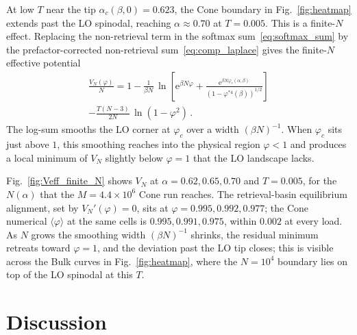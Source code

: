 \documentclass[letterpaper]{article} %
\newcommand{\e}{{\mathrm{e}}}
\newcommand{\Bnet}{\beta}
\newcommand{\ac}{\alpha_c}
\begin{document}
At low $T$ near the tip $\ac(\Bnet, 0) = 0.623$, the Cone boundary in Fig.~\ref{fig:heatmap} extends past the LO spinodal, reaching $\alpha \approx 0.70$ at $T = 0.005$. This is a finite-$N$ effect. Replacing the non-retrieval term in the softmax sum~\eqref{eq:softmax_sum} by the prefactor-corrected non-retrieval sum~\eqref{eq:comp_laplace} gives the finite-$N$ effective potential
\begin{multline}
\frac{V_N(\varphi)}{N} = 1 - \frac{1}{\Bnet N}\,
   \ln\!\left[\e^{\Bnet N \varphi} +
            \frac{\e^{\Bnet N \varphi_c(\alpha, \Bnet)}}{(1-\varphi^{*4}(\Bnet))^{1/2}} \right] \\
    - \frac{T(N-3)}{2N}\,\ln(1 - \varphi^{2})\,.
\label{eq:V-finite-N}
\end{multline}
The log-sum smooths the LO corner at $\varphi_c$ over a width $(\Bnet N)^{-1}$. When $\varphi_c$ sits just above $1$, this smoothing reaches into the physical region $\varphi < 1$ and produces a local minimum of $V_N$ slightly below $\varphi = 1$ that the LO landscape lacks.

Fig.~\ref{fig:Veff_finite_N} shows $V_N$ at $\alpha = 0.62, 0.65, 0.70$ and $T = 0.005$, for the $N(\alpha)$ that the $M = 4.4 \times 10^6$ Cone run reaches. The retrieval-basin equilibrium alignment, set by $V_N'(\varphi) = 0$, sits at $\varphi = 0.995, 0.992, 0.977$; the Cone numerical $\langle\varphi\rangle$ at the same cells is $0.995, 0.991, 0.975$, within $0.002$ at every load. As $N$ grows the smoothing width $(\Bnet N)^{-1}$ shrinks, the residual minimum retreats toward $\varphi = 1$, and the deviation past the LO tip closes; this is visible across the Bulk curves in Fig.~\ref{fig:heatmap}, where the $N = 10^4$ boundary lies on top of the LO spinodal at this $T$.








\section{Discussion}
\label{sec:discussion}
\end{document}
